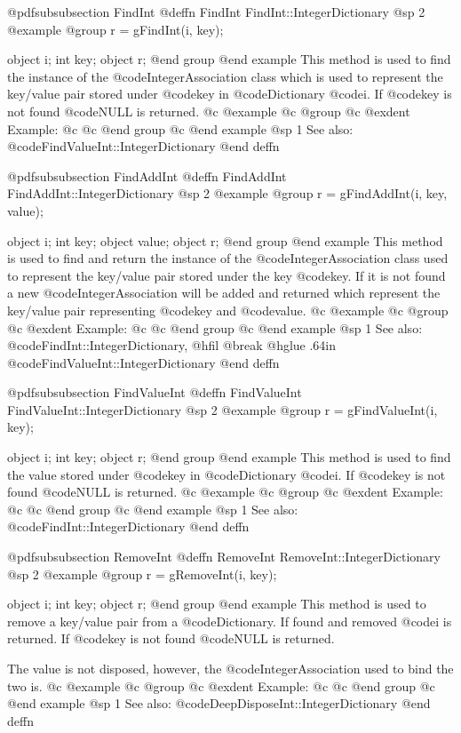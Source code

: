 @pdfsubsubsection {FindInt}
@deffn {FindInt} FindInt::IntegerDictionary
@sp 2
@example
@group
r = gFindInt(i, key);

object  i;
int     key;
object  r;
@end group
@end example
This method is used to find the instance of the @code{IntegerAssociation}
class which is used to represent the key/value pair stored under
@code{key} in @code{Dictionary} @code{i}.  If @code{key} is not found
@code{NULL} is returned.
@c @example
@c @group
@c @exdent Example:
@c 
@c @end group
@c @end example
@sp 1
See also:  @code{FindValueInt::IntegerDictionary}
@end deffn










@pdfsubsubsection {FindAddInt}
@deffn {FindAddInt} FindAddInt::IntegerDictionary
@sp 2
@example
@group
r = gFindAddInt(i, key, value);

object  i;
int     key;
object  value;
object  r;
@end group
@end example
This method is used to find and return the instance of the
@code{IntegerAssociation} class used to represent the key/value pair
stored under the key @code{key}.  If it is not found a new
@code{IntegerAssociation} will be added and returned which represent the
key/value pair representing @code{key} and @code{value}.
@c @example
@c @group
@c @exdent Example:
@c 
@c @end group
@c @end example
@sp 1
See also:  @code{FindInt::IntegerDictionary,}
@hfil @break @hglue .64in      @code{FindValueInt::IntegerDictionary}
@end deffn









@pdfsubsubsection {FindValueInt}
@deffn {FindValueInt} FindValueInt::IntegerDictionary
@sp 2
@example
@group
r = gFindValueInt(i, key);

object  i;
int     key;
object  r;
@end group
@end example
This method is used to find the value stored under @code{key} in
@code{Dictionary} @code{i}.  If @code{key} is not found @code{NULL} is
returned.
@c @example
@c @group
@c @exdent Example:
@c 
@c @end group
@c @end example
@sp 1
See also:  @code{FindInt::IntegerDictionary}
@end deffn











@pdfsubsubsection {RemoveInt}
@deffn {RemoveInt} RemoveInt::IntegerDictionary
@sp 2
@example
@group
r = gRemoveInt(i, key);

object  i;
int     key;
object  r;
@end group
@end example
This method is used to remove a key/value pair from a @code{Dictionary}.
If found and removed @code{i} is returned.  If @code{key} is not found
@code{NULL} is returned.

The value is not disposed, however, the @code{IntegerAssociation} used to
bind the two is.
@c @example
@c @group
@c @exdent Example:
@c 
@c @end group
@c @end example
@sp 1
See also:  @code{DeepDisposeInt::IntegerDictionary}
@end deffn





